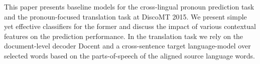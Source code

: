This paper presents baseline models for the cross-lingual pronoun prediction task and the pronoun-focused translation task at DiscoMT 2015. We present simple yet effective classifiers for the former and discuss the impact of various contextual features on the prediction performance. In the translation task we rely on the document-level decoder Docent and a cross-sentence target language-model over selected words based on the parts-of-speech of the aligned source language words.

